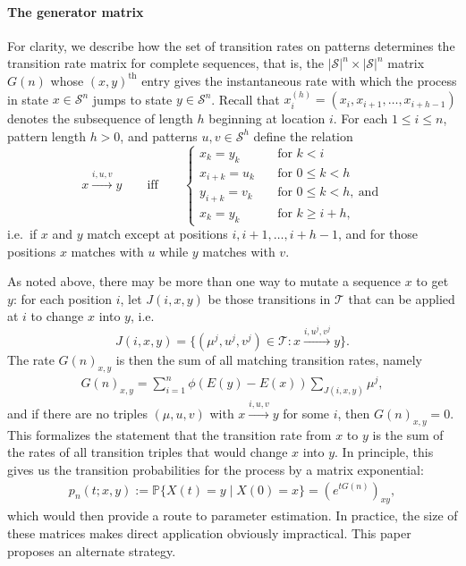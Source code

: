 \documentclass{article}
\renewcommand{\P}{\mathbb{P}}
\newcommand{\calS}{\mathcal{S}}  %
\newcommand{\calT}{\mathcal{T}}  %
\newcommand{\st}{\colon}  %
\theoremstyle{plain}
\theoremstyle{definition}
\begin{document}
\paragraph{The generator matrix}
For clarity, we describe how the set of transition rates on patterns determines the transition rate matrix for complete sequences, that is,
the $|\calS|^n \times |\calS|^n$ matrix $G(n)$ whose $(x,y)^\text{th}$ entry gives the instantaneous rate
with which the process in state $x \in \calS^n$ jumps to state $y \in \calS^n$.
Recall that $x_i^{(h)} = (x_i, x_{i+1}, \ldots, x_{i+h-1})$ denotes the subsequence of length $h$ beginning at location $i$.
For each $1\le i \le n$, pattern length $h > 0$, and patterns $u,v \in \calS^h$ define the relation
\[
x \xrightarrow{i,u,v} y \qquad \text{iff} \qquad \begin{cases}
  x_k = y_k \quad &\text{for } k<i \\
  x_{i+k} = u_k \quad &\text{for } 0 \le k < h \\
  y_{i+k} = v_k \quad &\text{for } 0 \le k < h,\ \text{and} \\
  x_k = y_k \quad &\text{for } k\ge i+h ,
\end{cases}
\]
i.e.\ if $x$ and $y$ match except at positions $i,i+1,\ldots,i+h-1$,
and for those positions $x$ matches with $u$ while $y$ matches with $v$.

As noted above, there may be more than one way to mutate a sequence $x$ to get $y$:
for each position $i$, let $J(i,x,y)$ be those transitions in $\calT$ that can be applied at $i$
to change $x$ into $y$, i.e.
\[
J(i,x,y) = \{ (\mu^j,u^j,v^j) \in \calT \st x \xrightarrow{i,u^j,v^j} y \}.
\]
The rate $G(n)_{x,y}$ is then the sum of all matching transition rates,
namely
\begin{align} \label{eqn:G_defn}
    G(n)_{x,y} = \sum_{i=1}^n \phi(E(y)-E(x)) \sum_{J(i,x,y)}  \mu^j ,
\end{align}
and if there are no triples $(\mu,u,v)$ with $x \xrightarrow{i,u,v} y$ for some $i$, then $G(n)_{x,y}=0$.
This formalizes the statement that the transition rate from $x$ to $y$ is the sum of the rates of all transition triples
that would change $x$ into $y$.
In principle, this gives us the transition probabilities for the process by a matrix exponential:
\begin{align} \label{eqn:full_likelihood}
    p_n(t;x,y) := \P\{ X(t) = y \mid X(0) = x \} = \left(e^{tG(n)}\right)_{xy} ,
\end{align}
which would then provide a route to parameter estimation.
In practice, the size of these matrices makes direct application obviously impractical.
This paper proposes an alternate strategy.
\end{document}
